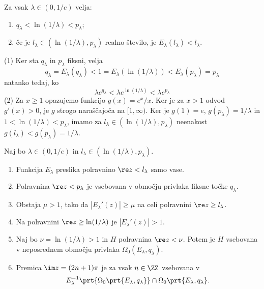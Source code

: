 \begin{lema} \label{lem:enadva}
    Za vsak \(\lambda \in (0, 1/e)\) velja:
    \begin{enumerate}[label=(\arabic*)]
        \item \(q_\lambda < \ln (1 / \lambda) < p_\lambda\);
        \item če je \(l_\lambda \in (\ln (1 / \lambda), p_\lambda)\) realno število, je \(E_\lambda (l_\lambda) < l_\lambda\).
    \end{enumerate}
\end{lema}

\begin{dokaz}
    (1) Ker sta \(q_\lambda\) in \(p_\lambda\) fiksni, velja
    \[q_\lambda = E_\lambda (q_\lambda) < 1 = E_\lambda (\ln (1 / \lambda)) < E_\lambda (p_\lambda) = p_\lambda\]
    natanko tedaj, ko
    \[\lambda e^{q_\lambda} < \lambda e^{\ln (1 / \lambda)} < \lambda e^{p_\lambda}\]
    (2) Za \(x \geq 1\) opazujemo funkcijo \(g (x) = e^x / x\). Ker je za \(x > 1\) odvod \(g' (x) > 0\), je \(g\) strogo naraščajoča na \([1, \infty)\). Ker je \(g (1) = e\), \(g (p_\lambda) = 1 / \lambda\) in \(1 < \ln (1 / \lambda) < p_\lambda\), imamo za \(l_\lambda \in (\ln (1 / \lambda), p_\lambda)\) neenakost \(g (l_\lambda) < g (p_\lambda) = 1 / \lambda\).
\end{dokaz}

\begin{trditev} \label{prop:trinajst}
    Naj bo \(\lambda \in (0, 1/e)\) in \(l_\lambda \in (\ln (1 / \lambda), p_\lambda)\).
    \begin{enumerate}[label=(\arabic*)]
        \item Funkcija \(E_\lambda\) preslika polravnino \(\re z < l_\lambda\) samo vase.
        \item Polravnina \(\re z < p_\lambda\) je vsebovana v območju privlaka fiksne točke \(q_\lambda\).
        \item Obstaja \(\mu > 1\), tako da \(|E_\lambda' (z)| \geq \mu\) na celi polravnini \(\re z \geq l_\lambda\).
        \item Na polravnini \(\re z \geq \ln (1 / \lambda)\) je \(|E_\lambda' (z)| > 1\).
        \item Naj bo \(\nu = \ln (1 / \lambda) > 1\) in \(H\) polravnina \(\re z < \nu\). Potem je \(H\) vsebovana v neposrednem območju privlaka \(\Omega_0 (E_\lambda, q_\lambda)\).
        \item Premica \(\im z = (2n + 1) \pi\) je za vsak \(n \in \ZZ\) vsebovana v
              \[E_\lambda^{-1} \prt{\Omega_0 \prt{E_\lambda, q_\lambda}} \cap \Omega_0 \prt{E_\lambda, q_\lambda}.\]
    \end{enumerate}
\end{trditev}

